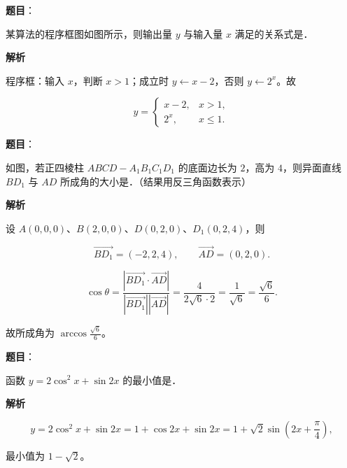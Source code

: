 \begin{answer}

\textbf{题目}：

某算法的程序框图如图所示，则输出量 $y$ 与输入量 $x$ 满足的关系式是\gkblank{}．
\nopagebreak[4]
\begin{center}\end{center}
\nopagebreak[4]
\textbf{解析}

程序框：输入 $x$，判断 $x>1$；成立时 $y\leftarrow x-2$，否则 $y\leftarrow2^x$。故

\nopagebreak[4]
\[y=\begin{cases}x-2,&x>1,\\2^x,&x\leqslant1.\end{cases}\]


\end{answer}
\begin{answer}

\textbf{题目}：

如图，若正四棱柱 $ABCD-A_1B_1C_1D_1$ 的底面边长为 $2$，高为 $4$，则异面直线 $BD_1$ 与 $AD$ 所成角的大小是\gkblank{}．（结果用反三角函数表示）
\nopagebreak[4]
\begin{center}\end{center}
\nopagebreak[4]
\textbf{解析}

设 $A(0,0,0)$、$B(2,0,0)$、$D(0,2,0)$、$D_1(0,2,4)$，则

\nopagebreak[4]
\[\overrightarrow{BD_1}=(-2,2,4),\qquad \overrightarrow{AD}=(0,2,0).\]

\nopagebreak[4]
\[\cos\theta=\frac{|\overrightarrow{BD_1}\cdot\overrightarrow{AD}|}{|\overrightarrow{BD_1}||\overrightarrow{AD}|}
=\frac{4}{2\sqrt6\cdot2}=\frac{1}{\sqrt6}=\frac{\sqrt6}{6}.\]

故所成角为 $\arccos\frac{\sqrt6}{6}$。


\end{answer}
\begin{answer}

\textbf{题目}：

函数 $y=2\cos^2x+\sin2x$ 的最小值是\gkblank{}．

\textbf{解析}

\nopagebreak[4]
\[y=2\cos^2x+\sin2x=1+\cos2x+\sin2x=1+\sqrt2\sin\left(2x+\frac\pi4\right),\]

最小值为 $1-\sqrt2$。


\end{answer}
